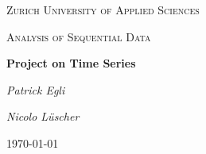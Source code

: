 \begin{titlepage}
    \centering
    {\scshape\LARGE Zurich University of Applied Sciences\par}
    \vspace{1cm}
    {\scshape\Large Analysis of Sequential Data\par}
    \vspace{1.5cm}

    {\huge\bfseries Project on Time Series\par}
    \vspace{2cm}
    {\Large\itshape Patrick Egli\par}
    \vspace{0.1cm}
    {\Large\itshape Nicolo Lüscher\par}
    \vfill

    {\large \today\par}
\end{titlepage}